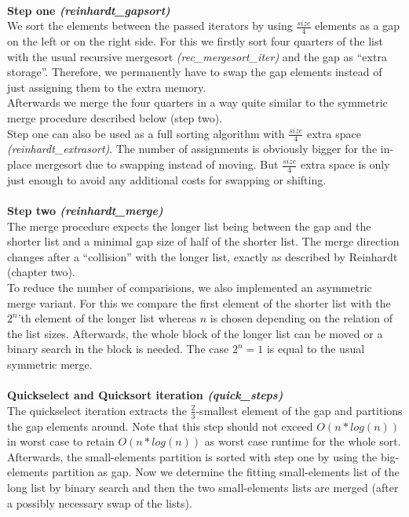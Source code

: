 \documentclass[11pt,pdftex,a4paper, twocolumn]{article}
\begin{document}
$ $ \\
\textbf{Step one \textit{(reinhardt\_gapsort)}} \\
We sort the elements between the passed iterators by using $\frac{size}{4}$ elements as a gap on the left or on the right side. For this we firstly sort four quarters of the list with the usual recursive mergesort \textit{(rec\_mergesort\_iter)} and the gap as “extra storage”. Therefore, we permanently have to swap the gap elements instead of just assigning them to the extra memory. \\
Afterwards we merge the four quarters in a way quite similar to the symmetric merge procedure described below (step two). \\
Step one can also be used as a full sorting algorithm with $\frac{size}{4}$ extra space \textit{(reinhardt\_extrasort)}. The number of assignments is obviously bigger for the in-place mergesort due to swapping instead of moving. But $\frac{size}{4}$ extra space is only just enough to avoid any additional costs for swapping or shifting. \\
$ $ \\
\textbf{Step two \textit{(reinhardt\_merge)}} \\
The merge procedure expects the longer list being between the gap and the shorter list and a minimal gap size of half of the shorter list. The merge direction changes after a “collision” with the longer list, exactly as described by Reinhardt\cite{Reinhardt92} (chapter two). \\
To reduce the number of comparisions, we also implemented an asymmetric merge variant. For this we compare the first element of the shorter list with the $2^n$’th element of the longer list whereas $n$ is chosen depending on the relation of the list sizes. Afterwards, the whole block of the longer list can be moved or a binary search in the block is needed. The case $2^n = 1$ is equal to the usual symmetric merge. \\
$ $ \\
\textbf{Quickselect and Quicksort iteration \textit{(quick\_steps)}} \\
The quickselect iteration extracts the $\frac{2}{3}$-smallest element of the gap and partitions the gap elements around. Note that this step should not exceed $O(n*log(n))$ in worst case to retain $O(n*log(n))$ as worst case runtime for the whole sort. Afterwards, the small-elements partition is sorted with step one by using the big-elements partition as gap. Now we determine the fitting small-elements list of the long list by binary search and then the two small-elements lists are merged (after a possibly necessary swap of the lists). \\
\end{document}
